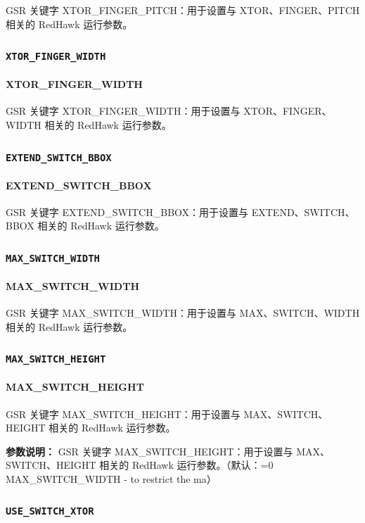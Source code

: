 GSR 关键字 XTOR_FINGER_PITCH：用于设置与 XTOR、FINGER、PITCH 相关的 RedHawk 运行参数。

\subsubsection{\texttt{XTOR_FINGER_WIDTH}}
\paragraph*{XTOR_FINGER_WIDTH}

GSR 关键字 XTOR_FINGER_WIDTH：用于设置与 XTOR、FINGER、WIDTH 相关的 RedHawk 运行参数。

\subsubsection{\texttt{EXTEND_SWITCH_BBOX}}
\paragraph*{EXTEND_SWITCH_BBOX}

GSR 关键字 EXTEND_SWITCH_BBOX：用于设置与 EXTEND、SWITCH、BBOX 相关的 RedHawk 运行参数。

\subsubsection{\texttt{MAX_SWITCH_WIDTH}}
\paragraph*{MAX_SWITCH_WIDTH}

GSR 关键字 MAX_SWITCH_WIDTH：用于设置与 MAX、SWITCH、WIDTH 相关的 RedHawk 运行参数。

\subsubsection{\texttt{MAX_SWITCH_HEIGHT}}
\paragraph*{MAX_SWITCH_HEIGHT}

GSR 关键字 MAX_SWITCH_HEIGHT：用于设置与 MAX、SWITCH、HEIGHT 相关的 RedHawk 运行参数。

\textbf{参数说明：}
GSR 关键字 MAX\_SWITCH\_HEIGHT：用于设置与 MAX、SWITCH、HEIGHT 相关的 RedHawk 运行参数。（默认：=0 MAX\_SWITCH\_WIDTH - to restrict the ma）

\subsubsection{\texttt{USE_SWITCH_XTOR}}
